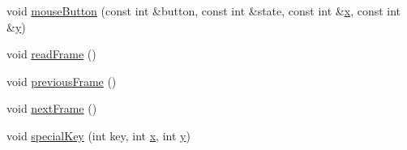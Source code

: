 \begin{DoxyCompactItemize}
\item 
void \hyperlink{structmodel_1_1_d_dgl_a19e00960d5b8ac358ed7929bfcd3e284}{mouse\+Button} (const int \&button, const int \&state, const int \&\hyperlink{generate_s_t_lcyl_8m_a9336ebf25087d91c818ee6e9ec29f8c1}{x}, const int \&\hyperlink{generate_s_t_lcyl_8m_a2fb1c5cf58867b5bbc9a1b145a86f3a0}{y})
\item 
void \hyperlink{structmodel_1_1_d_dgl_ac50c83c6b9f4003fa9ac6c5d233fddc7}{read\+Frame} ()
\item 
void \hyperlink{structmodel_1_1_d_dgl_a4fb496ddd91301206330c39ab101b853}{previous\+Frame} ()
\item 
void \hyperlink{structmodel_1_1_d_dgl_ad9ad90ac80e3f22e69d5d68829cc9153}{next\+Frame} ()
\item 
void \hyperlink{structmodel_1_1_d_dgl_a9360df1ed8dfa3d2af9b3cd540950bf5}{special\+Key} (int key, int \hyperlink{generate_s_t_lcyl_8m_a9336ebf25087d91c818ee6e9ec29f8c1}{x}, int \hyperlink{generate_s_t_lcyl_8m_a2fb1c5cf58867b5bbc9a1b145a86f3a0}{y})
\end{DoxyCompactItemize}
